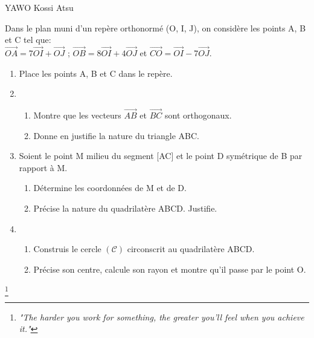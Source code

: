 \documentclass[12pt,a4paper]{book}
\newcommand{\prof}{YAWO Kossi Atsu}
\begin{document}
\begin{revision}{\prof}
\begin{exo}
Dans le plan muni d'un repère orthonormé (O, I, J), on considère les points A, B et C tel que:\\
$\overrightarrow{OA}=7\overrightarrow{OI}+\overrightarrow{OJ}$ \quad ; \quad $\overrightarrow{OB}=8\overrightarrow{OI}+4\overrightarrow{OJ}$ \quad et \quad $\overrightarrow{CO}=\overrightarrow{OI}-7\overrightarrow{OJ}$.
\begin{enumerate}
\item Place les points A, B et C dans le repère.
\item \begin{enumerate}
\item Montre que les vecteurs $\overrightarrow{AB}$ et $\overrightarrow{BC}$ sont orthogonaux.
\item Donne en justifie la nature du triangle ABC.
\end{enumerate}
\item Soient le point M milieu du segment [AC] et le point D symétrique de B par rapport à M.
\begin{enumerate}
\item Détermine les coordonnées de M et de D.
\item Précise la nature du quadrilatère ABCD. Justifie.
\end{enumerate} 
\item \begin{enumerate}
\item Construis le cercle $\mathcal{(C)}$ circonscrit au quadrilatère ABCD.
\item Précise son centre, calcule son rayon et montre qu'il passe par le point O.
\end{enumerate}
\end{enumerate}
\end{exo}
\footnote{\textit{"The harder you work for something, the greater you'll feel when you achieve it."}}
\end{revision}

\newpage
\end{document}
